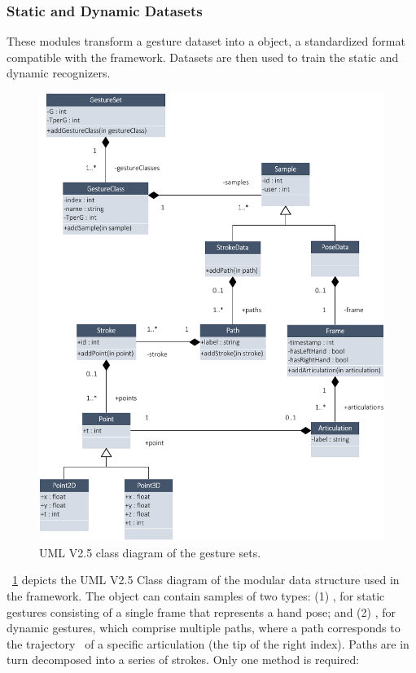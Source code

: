 \subsubsection{Static and Dynamic Datasets}
These modules transform a gesture dataset into a  object, \ie a standardized format compatible with the framework. Datasets are then used to train the static and dynamic recognizers.
\begin{figure}[!ht]
    \centering
    \vspace{-6pt}
    \captionsetup{justification=centering}
    \includegraphics[width=0.9\linewidth]{Figures/QuantumLeap/Architecture/QuantumLeap-UML.pdf}
    \caption{UML V2.5 class diagram of the gesture sets.}
    \label{fig:quantumleap:dataset-uml}
\end{figure}
\fig~\ref{fig:quantumleap:dataset-uml} depicts the UML V2.5 \cite{Bush:2011} Class diagram of the modular data structure used in the framework. The  object can contain samples of two types: (1) , for static gestures consisting of a single frame that represents a hand pose; and (2) , for dynamic gestures, which comprise multiple paths, where a path corresponds to the trajectory~\cite{Caputo:2018} of a specific articulation (\eg the tip of the right index). Paths are in turn decomposed into a series of strokes. Only one method is required:
